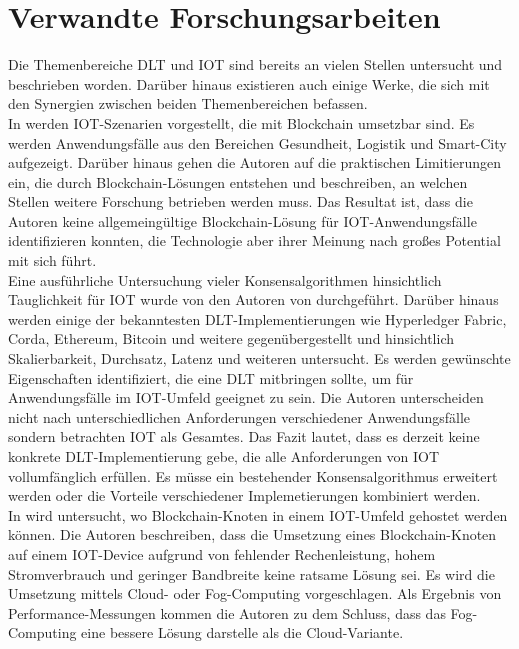 \chapter{Verwandte Forschungsarbeiten}
\label{ch:relatedwork}
Die Themenbereiche \ac{DLT} und \ac{IOT} sind bereits an vielen Stellen untersucht und beschrieben worden. Darüber hinaus existieren auch einige Werke, die sich mit den Synergien zwischen beiden Themenbereichen befassen.\\
In \cite{Review2018} werden \ac{IOT}-Szenarien vorgestellt, die mit Blockchain umsetzbar sind. Es werden Anwendungsfälle aus den Bereichen Gesundheit, Logistik und Smart-City aufgezeigt. Darüber hinaus gehen die Autoren auf die praktischen Limitierungen ein, die durch Blockchain-Lösungen entstehen und beschreiben, an welchen Stellen weitere Forschung betrieben werden muss. Das Resultat ist, dass die Autoren keine allgemeingültige Blockchain-Lösung für \ac{IOT}-Anwendungsfälle identifizieren konnten, die Technologie aber ihrer Meinung nach großes Potential mit sich führt.\\
Eine ausführliche Untersuchung vieler Konsensalgorithmen hinsichtlich Tauglichkeit für \ac{IOT} wurde von den Autoren von \cite{Salimitari2018ASO} durchgeführt. Darüber hinaus werden einige der bekanntesten DLT-Implementierungen wie Hyperledger Fabric, Corda, Ethereum, Bitcoin und weitere gegenübergestellt und hinsichtlich Skalierbarkeit, Durchsatz, Latenz und weiteren untersucht. Es werden gewünschte Eigenschaften identifiziert, die eine \ac{DLT} mitbringen sollte, um für Anwendungsfälle im \ac{IOT}-Umfeld geeignet zu sein. Die Autoren unterscheiden nicht nach unterschiedlichen Anforderungen verschiedener Anwendungsfälle sondern betrachten \ac{IOT} als Gesamtes. Das Fazit lautet, dass es derzeit keine konkrete \ac{DLT}-Implementierung gebe, die alle Anforderungen von \ac{IOT} vollumfänglich erfüllen. Es müsse ein bestehender Konsensalgorithmus erweitert werden oder die Vorteile verschiedener Implemetierungen kombiniert werden.\\
In \cite{BaaS2016} wird untersucht, wo Blockchain-Knoten in einem \ac{IOT}-Umfeld gehostet werden können. Die Autoren beschreiben, dass die Umsetzung eines Blockchain-Knoten auf einem \ac{IOT}-Device aufgrund von fehlender Rechenleistung, hohem Stromverbrauch und geringer Bandbreite keine ratsame Lösung sei. Es wird die Umsetzung mittels Cloud- oder Fog-Computing vorgeschlagen. Als Ergebnis von Performance-Messungen kommen die Autoren zu dem Schluss, dass das Fog-Computing eine bessere Lösung darstelle als die Cloud-Variante.\\
